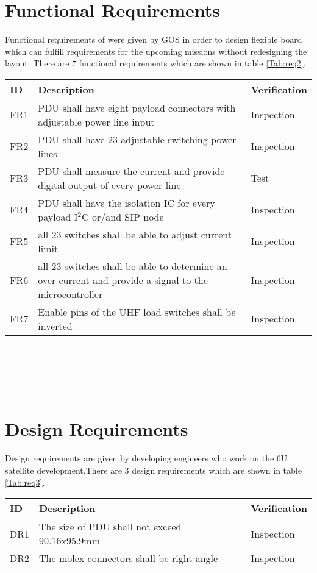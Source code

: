 \section{Functional Requirements}
Functional requirements of were given by GOS in order to design flexible board which can fulfill requirements for the upcoming missions without redesigning the layout. There are 7 functional requirements which are shown in table \ref{Tab:req2}. 
\begin{tabular}{p{1cm}p{11cm}p{2cm}} \toprule
	ID & Description & Verification\\ \midrule
FR1 & PDU shall have eight payload connectors with adjustable power line input & Inspection\\
FR2 & PDU shall have 23 adjustable switching power lines & Inspection\\
FR3 & PDU shall measure the current and provide digital output of every power line & Test\\
FR4 & PDU shall have the isolation IC for every payload I$^2$C or/and SIP node & Inspection\\
FR5 &  all 23 switches shall be able to adjust current limit & Inspection\\
FR6 & all 23 switches shall be able to determine an over current and provide a signal to the microcontroller & Inspection\\
FR7 & Enable pins of the UHF load switches shall be inverted & Inspection\\
\bottomrule
\end{tabular}\\ \\ \\ \\
\label{Tab:req2}

\section{Design Requirements}
Design requirements are given by developing engineers who work on the 6U satellite development.There are 3 design requirements which are shown in table \ref{Tab:req3}. 

\begin{tabular}{p{1cm}p{11cm}p{2cm}} \toprule
	ID & Description & Verification \\ \midrule
DR1 & The size of PDU shall not exceed 90.16x95.9mm & Inspection\\
  
DR2 & The molex connectors shall be right angle & Inspection\\
\bottomrule
\end{tabular}\\ 
\label{Tab:req3}



